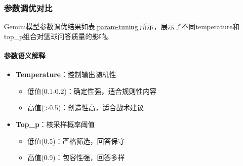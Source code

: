 \documentclass{article}
\theoremstyle{plain}
\theoremstyle{definition}
\theoremstyle{remark}
\begin{document}
\subsubsection{参数调优对比}
Gemini模型参数调优结果如表\ref{param-tuning}所示，展示了不同temperature和top\_p组合对篮球问答质量的影响。
\begin{table}[t]
\caption{Gemini模型参数调优结果（篮球问答场景）}
\label{param-tuning}
\vskip 0.15in
\begin{center}
\begin{small}
\begin{sc}
\end{sc}
\end{small}
\end{center}
\vskip -0.1in
\end{table}

\paragraph{参数语义解释}
\begin{itemize}
\item \textbf{Temperature}：控制输出随机性
  \begin{itemize}
  \item 低值(0.1-0.2)：确定性强，适合规则性内容
  \item 高值(>0.5)：创造性高，适合战术建议
  \end{itemize}
  
\item \textbf{Top\_p}：核采样概率阈值
  \begin{itemize}
  \item 低值(0.5)：严格筛选，回答保守
  \item 高值(0.9)：包容性强，回答多样
  \end{itemize}
\end{itemize}
\end{document}
